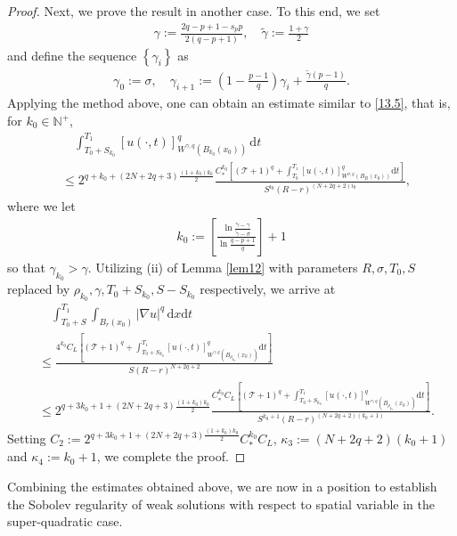 \documentclass[reqno,10pt]{amsart}
\numberwithin{equation}{section}
\begin{document}
\begin{proof}
	Next, we prove the result in another case. To this end, we set
	\begin{align*}
		\gamma:=\frac{2q-p+1-s_pp}{2(q-p+1)},\quad \tilde{\gamma}:=\frac{1+\gamma}{2}
	\end{align*}
	and define the sequence $\left\lbrace\gamma_i\right\rbrace$ as
	\begin{align*}
		\gamma_0:=\sigma,\quad\gamma_{i+1}:=\left(1-\frac{p-1}{q}\right)\gamma_i+\frac{\tilde{\gamma}(p-1)}{q}. 
	\end{align*}
	Applying the method above, one can obtain an estimate similar to \eqref{13.5}, that is, for $k_0\in \mathbb{N}^+$,
	\begin{align*}
		&\quad\int_{T_0+S_{k_0}}^{T_1}[u(\cdot,t)]^q_{W^{\gamma,q}(B_{k_0}(x_0))}\,\mathrm{d}t\nonumber\\
		&\le2^{q+k_0+(2N+2q+3)\frac{(1+k_0)k_0}{2} }\frac{C_{*}^{k_0}\left[\left(\mathcal{T}+1\right)^q+\int_{T_0}^{T_1}[u(\cdot,t)]^q_{W^{\sigma,q}\left( B_{R}(x_0)\right)}\mathrm{d}t\right]}{S^{i_0}(R-r)^{(N+2q+2)i_0}},
	\end{align*}
	where we let
	\begin{align*}
		k_0:=\left[\frac{\ln\frac{\tilde{\gamma}-\gamma}{\tilde{\gamma}-\sigma}}{\ln\frac{q-p+1}{q}}\right]+1 
	\end{align*}
	so that $\gamma_{k_0}>\gamma$. Utilizing (ii) of Lemma \ref{lem12} with parameters $R,\sigma,T_0,S$ replaced by $\rho_{k_0},\gamma,T_0+S_{k_0},S-S_{k_0}$ respectively, we arrive at
	\begin{align*}
		&\quad\int_{T_0+S}^{T_1}\int_{B_r(x_0)}|\nabla u|^q\,\mathrm{d}x\mathrm{d}t\\
		&\le\frac{4^{k_0}C_L\left[\left(\mathcal{T}+1\right)^q+\int_{T_0+S_{k_0}}^{T_1}[u(\cdot,t)]^q_{W^{\gamma,q}\left( B_{\rho_{k_0}}(x_0)\right)}\mathrm{d}t\right]}{S(R-r)^{N+2q+2}}\\
		&\le 2^{q+3k_0+1+(2N+2q+3)\frac{(1+k_0)k_0}{2}}\frac{C_*^{k_0}C_L\left[\left(\mathcal{T}+1\right)^q+\int_{T_0+S_{k_0}}^{T_1}[u(\cdot,t)]^q_{W^{\gamma,q}\left( B_{\rho_{k_0}}(x_0)\right)}\mathrm{d}t\right]}{S^{k_0+1}(R-r)^{(N+2q+2)(k_0+1)}}.
	\end{align*}
	Setting $C_2:=2^{q+3k_0+1+(2N+2q+3)\frac{(1+k_0)k_0}{2}}C_*^{k_0}C_L$, $\kappa_3:=(N+2q+2)(k_0+1)$ and $\kappa_4:=k_0+1$, we complete the proof.
\end{proof}

Combining the estimates obtained above, we are now in a position to establish the Sobolev regularity of weak solutions with respect to spatial variable in the super-quadratic case.
\end{document}

